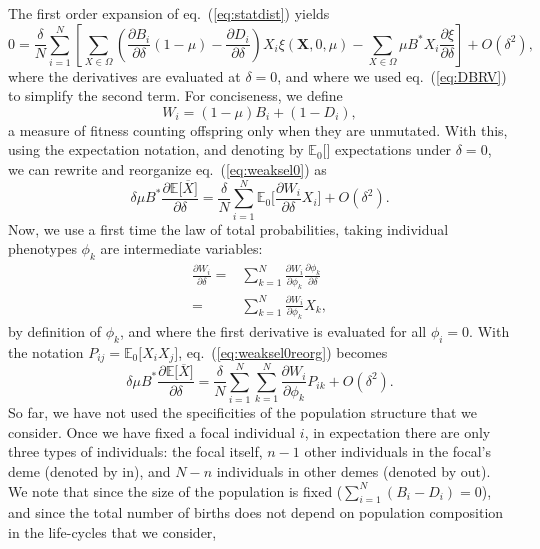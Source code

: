 \documentclass[11pt, letterpaper]{article}
\renewcommand{\eqref}[1]{\textup{{\normalfont eq.~(\ref{#1}}\normalfont)}}
\newcommand{\derivn}[2]{\frac{\partial #1}{\partial #2}}
\newcommand{\Esp}[1]{\mathbb{E}\big[ #1\big]}%
\newcommand{\Espzero}[1]{\mathbb{E}_0\big[ #1\big]}%
\newcommand{\bigO}[1]{O\left( #1 \right)}
\newcommand{\inn}{\textrm{in}}
\newcommand{\out}{\textrm{out}}
\newcommand{\selstr}{\delta}
\begin{document}
The first order expansion of \eqref{eq:statdist} yields
%
\begin{equation}\label{eq:weaksel0}
0 = \frac{\selstr}{N} \sum_{i=1}^N \left[ \sum_{X\in \Omega} \left( \derivn{B_i}{\selstr} (1-\mu) - \derivn{D_i}{\selstr} \right) X_i  \xi(\mathbf{X}, 0, \mu) - \sum_{X\in \Omega} \mu B^* X_i  \derivn{\xi}{\selstr}\right]  + \bigO{\selstr^2},
\end{equation}
%
where the derivatives are evaluated at $\selstr = 0$, and where we used \eqref{eq:DBRV} to simplify the second term. For conciseness, we define 
%
\begin{equation}\label{eq:app:defW}
W_i = (1-\mu) B_i + (1-D_i), 
\end{equation}
%
a measure of fitness counting offspring only when they are unmutated. With this, using the expectation notation, and denoting by $\Espzero{}$ expectations under $\selstr = 0$, we can rewrite and reorganize \eqref{eq:weaksel0} as
%
\begin{equation}\label{eq:weaksel0reorg}
\selstr \mu B^* \derivn{\Esp{\overline{X}}}{\selstr} = \frac{\selstr}{N} \sum_{i=1}^N \Espzero{ \derivn{W_i}{\selstr} X_i } + \bigO{\selstr^2}.
\end{equation}
%
Now, we use a first time the law of total probabilities, taking individual phenotypes $\phi_k$ are intermediate variables:
%
\begin{align}
\derivn{W_i}{\selstr} =& \sum_{k=1}^N \derivn{W_i}{\phi_k} \derivn{\phi_k}{\selstr} \nonumber \\
=& \sum_{k=1}^N \derivn{W_i}{\phi_k} X_k,
\label{eq:totalproba1}
\end{align}
%
by definition of $\phi_k$, and where the first derivative is evaluated for all $\phi_i = 0$. With the notation $P_{ij} = \Espzero{X_i X_j}$, \eqref{eq:weaksel0reorg} becomes
%
\begin{equation}\label{eq:weaksel1}
\selstr \mu B^* \derivn{\Esp{\overline{X}}}{\selstr} = \frac{\selstr}{N} \sum_{i=1}^N \sum_{k=1}^N \derivn{W_i}{\phi_k} P_{ik} + \bigO{\selstr^2}.
\end{equation}
%
So far, we have not used the specificities of the population structure that we consider. Once we have fixed a focal individual $i$, in expectation there are only three types of individuals: the focal itself, $n-1$ other individuals in the focal's deme (denoted by $\inn$), and $N - n$ individuals in other demes (denoted by $\out$). We note that since the size of the population is fixed ($\sum_{i=1}^N (B_i-D_i)=0$), and since the total number of births does not depend on population composition in the life-cycles that we consider, 
\end{document}
